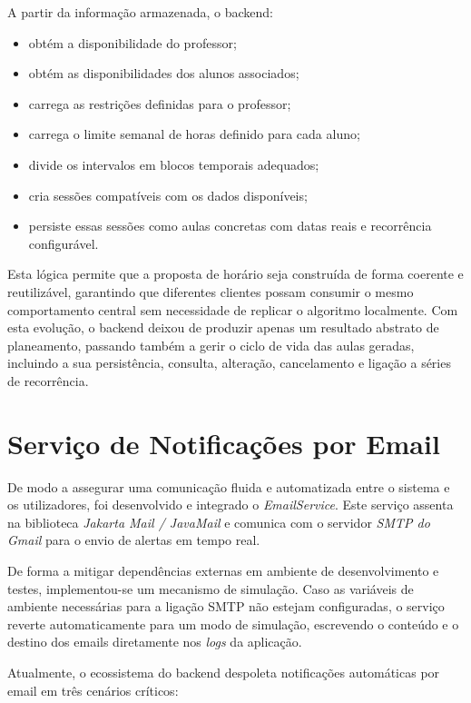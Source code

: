 A partir da informação armazenada, o backend:

\begin{itemize}
    \item obtém a disponibilidade do professor;
    \item obtém as disponibilidades dos alunos associados;
    \item carrega as restrições definidas para o professor;
    \item carrega o limite semanal de horas definido para cada aluno;
    \item divide os intervalos em blocos temporais adequados;
    \item cria sessões compatíveis com os dados disponíveis;
    \item persiste essas sessões como aulas concretas com datas reais e recorrência configurável.
\end{itemize}

Esta lógica permite que a proposta de horário seja construída de forma coerente e reutilizável, garantindo que diferentes clientes possam consumir
o mesmo comportamento central sem necessidade de replicar o algoritmo localmente.
Com esta evolução, o backend deixou de produzir apenas um resultado abstrato de planeamento, passando também a gerir o ciclo de vida das aulas geradas, incluindo a sua persistência, consulta, alteração, cancelamento e ligação a séries de recorrência.

\section{Serviço de Notificações por Email}

De modo a assegurar uma comunicação fluida e automatizada entre o sistema e os utilizadores, foi desenvolvido e integrado o \textit{EmailService}. Este serviço assenta na biblioteca \textit{Jakarta Mail / JavaMail} e comunica com o servidor \textit{SMTP do Gmail} para o envio de alertas em tempo real.

De forma a mitigar dependências externas em ambiente de desenvolvimento e testes, implementou-se um mecanismo de simulação. Caso as variáveis de ambiente necessárias para a ligação SMTP não estejam configuradas, o serviço reverte automaticamente para um modo de simulação, escrevendo o conteúdo e o destino dos emails diretamente nos \textit{logs} da aplicação.

Atualmente, o ecossistema do backend despoleta notificações automáticas por email em três cenários críticos:

